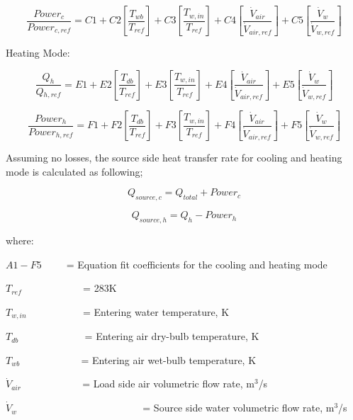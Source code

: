 \begin{equation}
\frac{{Power{}_c}}{{Power{}_{c,ref}}} = C1 + C2\left[ {\frac{{{T_{wb}}}}{{{T_{ref}}}}} \right] + C3\left[ {\frac{{T{}_{w,in}}}{{T{}_{ref}}}} \right] + C4\left[ {\frac{{{{\dot V}_{air}}}}{{{{\dot V}_{air,ref}}}}} \right] + C5\left[ {\frac{{{{\dot V}_w}}}{{{{\dot V}_{w,ref}}}}} \right]
\end{equation}

Heating Mode:

\begin{equation}
\frac{{{Q_h}}}{{Q{}_{h,ref}}} = E1 + E2\left[ {\frac{{{T_{db}}}}{{{T_{ref}}}}} \right] + E3\left[ {\frac{{T{}_{w,in}}}{{T{}_{ref}}}} \right] + E4\left[ {\frac{{{{\dot V}_{air}}}}{{{{\dot V}_{air,ref}}}}} \right] + E5\left[ {\frac{{{{\dot V}_w}}}{{{{\dot V}_{w,ref}}}}} \right]
\end{equation}

\begin{equation}
\frac{{Powe{r_h}}}{{Power{}_{h,ref}}} = F1 + F2\left[ {\frac{{{T_{db}}}}{{{T_{ref}}}}} \right] + F3\left[ {\frac{{T{}_{w,in}}}{{T{}_{ref}}}} \right] + F4\left[ {\frac{{{{\dot V}_{air}}}}{{{{\dot V}_{air,ref}}}}} \right] + F5\left[ {\frac{{{{\dot V}_w}}}{{{{\dot V}_{w,ref}}}}} \right]
\end{equation}

Assuming no losses, the source side heat transfer rate for cooling and heating mode is calculated as following;

\begin{equation}
{Q_{source,c}} = {Q_{total}} + Powe{r_c}
\end{equation}

\begin{equation}
{Q_{source,h}} = {Q_h} - Powe{r_h}
\end{equation}

where:

\(A1 - F5\) ~ ~~ = Equation fit coefficients for the cooling and heating mode

\({T_{ref}}\) ~~~~~~~~~~~ = 283K

\({T_{w,in}}\) ~~~~~~~~~~ = Entering water temperature, K

\({T_{db}}\) ~~~~~~~~~~~~ = Entering air dry-bulb temperature, K

\({T_{wb}}\) ~~~~~~~~~~~ = Entering air wet-bulb temperature, K

\({\dot V_{air}}\) ~~~~~~~~~~~ = Load side air volumetric flow rate, m\(^{3}\)/s

\({\dot V_w}\) ~~~~~~~~~~~~~~~~~~~~~~~~ = Source side water volumetric flow rate, m\(^{3}\)/s

